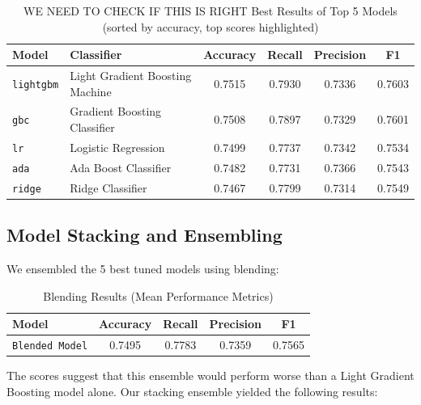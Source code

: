 \documentclass[a4paper,12pt]{article}
\begin{document}
\begin{table}[H]
\centering
\begin{tabular}{l l c c c c}
\toprule
\textbf{Model} & \textbf{Classifier} & \textbf{Accuracy} & \textbf{Recall} & \textbf{Precision} & \textbf{F1} \\
\midrule
\texttt{lightgbm} & Light Gradient Boosting Machine & \cellcolor{yellow}0.7515 & \cellcolor{yellow}0.7930 & 0.7336 & \cellcolor{yellow}0.7603 \\  %
\texttt{gbc}    & Gradient Boosting Classifier & 0.7508 & 0.7897 & 0.7329 & 0.7601 \\  %
\texttt{lr}     & Logistic Regression & 0.7499 & 0.7737 & 0.7342 & 0.7534 \\  %
\texttt{ada}    & Ada Boost Classifier & 0.7482 & 0.7731 & \cellcolor{yellow}0.7366 & 0.7543 \\  %
\texttt{ridge}  & Ridge Classifier & 0.7467 & 0.7799 & 0.7314 & 0.7549 \\  %
\bottomrule
\end{tabular}
\caption{WE NEED TO CHECK IF THIS IS RIGHT Best Results of Top 5 Models (sorted by accuracy, top scores highlighted)}
\label{tab:best_model_performance}
\end{table}


\subsection{Model Stacking and Ensembling}

We ensembled the 5 best tuned models using blending:

\begin{table}[H]
    \centering
    \begin{tabular}{l c c c c}
    \toprule
    \textbf{Model} & \textbf{Accuracy} & \textbf{Recall} & \textbf{Precision} & \textbf{F1} \\
    \midrule
    \texttt{Blended Model} & 0.7495 & 0.7783 & 0.7359 & 0.7565 \\
    \bottomrule
    \end{tabular}
    \caption{Blending Results (Mean Performance Metrics)}
    \label{tab:blending_performance}
\end{table}

The scores suggest that this ensemble would perform worse than a Light Gradient Boosting model alone.
Our stacking ensemble yielded the following results:
\end{document}
